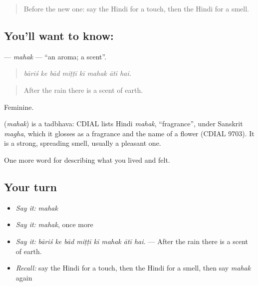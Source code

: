 \label{lesson:HI-C480-mahak}



\begin{quote}
Before the new one: say the Hindi for a touch, then the Hindi for a smell.
\end{quote}

\subsection*{You'll want to know: }
\textbf{} — \emph{mahak} — \textquotedblleft{}an aroma; a scent\textquotedblright{}.

\begin{quote}
       
\end{quote}

\begin{quote}
\emph{bāriś ke bād miṭṭī kī mahak ātī hai.}
\end{quote}

\begin{quote}
After the rain there is a scent of earth.
\end{quote}

Feminine.

\begin{cousinweb}
\textbf{} (\emph{mahak}) is a tadbhava: CDIAL lists Hindi \emph{mahak}, \textquotedblleft{}fragrance\textquotedblright{}, under Sanskrit \emph{magha}, which it glosses as a fragrance and the name of a flower (CDIAL 9703). It is a strong, spreading smell, usually a pleasant one.
\end{cousinweb}

\begin{grammarlens}[title={What you've built}]
One more word for describing what you lived and felt.
\end{grammarlens}

\subsection*{Your turn}
\begin{itemize}
\raggedright
  \item \emph{Say it:} \emph{mahak}
  \item \emph{Say it:} \emph{mahak}, once more
  \item \emph{Say it:} \emph{bāriś ke bād miṭṭī kī mahak ātī hai.} — After the rain there is a scent of earth.
  \item \emph{Recall:} say the Hindi for a touch, then the Hindi for a smell, then say \emph{mahak} again
\end{itemize}

